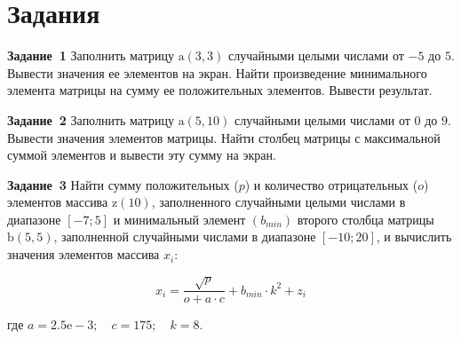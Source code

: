 \documentclass[aspectratio=169, mathserif]{beamer}%
\begin{document}
\section{Задания}
\sectionframe

\begin{frame}[fragile]{\textcolor{tpugreen}{\textbf{Задание~1}}}
\scriptsize
Заполнить матрицу $\mathrm{a}\left(3, 3\right)$ случайными целыми числами от $-5$ до $5$. Вывести значения ее элементов на экран. Найти произведение минимального элемента матрицы на сумму ее положительных элементов. Вывести результат.
\vfill
\end{frame}

\begin{frame}[fragile]{\textcolor{tpugreen}{\textbf{Задание~2}}}
\scriptsize
Заполнить матрицу $\mathrm{a}\left(5, 10\right)$ случайными целыми числами от $0$ до $9$. Вывести значения элементов матрицы. Найти столбец матрицы с максимальной суммой элементов и вывести эту сумму на экран.
\vfill
\end{frame}

\begin{frame}[fragile]{\textcolor{tpugreen}{\textbf{Задание~3}}}
\scriptsize
Найти сумму положительных ($p$) и количество отрицательных ($o$) элементов массива $\mathrm{z}\left(10\right)$, заполненного случайными целыми числами в диапазоне $\left[-7; 5\right]$ и минимальный элемент $\left(b_{min}\right)$ второго столбца матрицы $\mathrm{b\left(5, 5\right)}$, заполненной случайными числами в диапазоне $\left[-10; 20\right]$, и вычислить значения элементов массива $x_i$:
\vfill
\begin{normalsize}
\begin{equation*}
	x_i = \dfrac{\sqrt{p}}{o + a \cdot c} + b_{min} \cdot k^2 + z_i
\end{equation*}
\end{normalsize}
\vfill
где $a = 2.5\mathrm{e-}3; \quad c = 175; \quad k = 8$.
\vfill
\end{frame}

\end{document}
